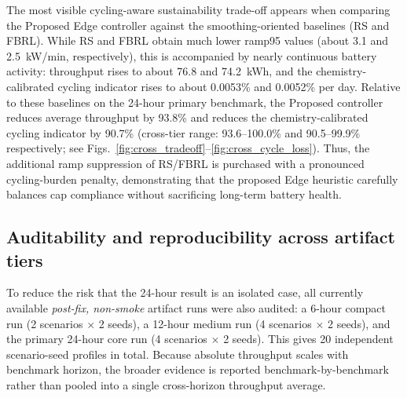 \documentclass[preprint,12pt]{elsarticle}
\begin{document}
The most visible cycling-aware sustainability trade-off appears when comparing the Proposed Edge controller against the smoothing-oriented baselines (RS and FBRL). While RS and FBRL obtain much lower ramp95 values (about 3.1 and 2.5~kW/min, respectively), this is accompanied by nearly continuous battery activity: throughput rises to about 76.8 and 74.2~kWh, and the chemistry-calibrated cycling indicator rises to about 0.0053\% and 0.0052\% per day. Relative to these baselines on the 24-hour primary benchmark, the Proposed controller reduces average throughput by 93.8\% and reduces the chemistry-calibrated cycling indicator by 90.7\% (cross-tier range: 93.6--100.0\% and 90.5--99.9\% respectively; see Figs.~\ref{fig:cross_tradeoff}--\ref{fig:cross_cycle_loss}). Thus, the additional ramp suppression of RS/FBRL is purchased with a pronounced cycling-burden penalty, demonstrating that the proposed Edge heuristic carefully balances cap compliance without sacrificing long-term battery health.

\subsection*{Auditability and reproducibility across artifact tiers}
To reduce the risk that the 24-hour result is an isolated case, all currently available \emph{post-fix, non-smoke} artifact runs were also audited: a 6-hour compact run (2 scenarios $\times$ 2 seeds), a 12-hour medium run (4 scenarios $\times$ 2 seeds), and the primary 24-hour core run (4 scenarios $\times$ 2 seeds). This gives 20 independent scenario-seed profiles in total. Because absolute throughput scales with benchmark horizon, the broader evidence is reported benchmark-by-benchmark rather than pooled into a single cross-horizon throughput average.
\begin{table}[H]
\centering
\caption{Cross-benchmark robustness summary using all currently available post-fix artifact runs.}
\label{tab:robustness}
\footnotesize
\setlength{\tabcolsep}{3pt}
\end{table}
\end{document}
